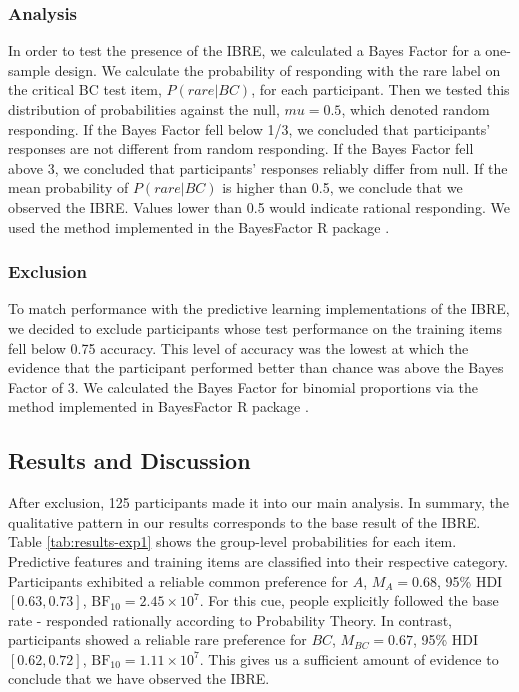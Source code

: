 \documentclass[10pt,letterpaper]{article}
\begin{document}
\subsubsection{Analysis}

In order to test the presence of the IBRE, we calculated a Bayes Factor for a one-sample design.
We calculate the probability of responding with the rare label on the critical BC test item, $P(rare|BC)$, for each participant.
Then we tested this distribution of probabilities against the null, $mu = 0.5$, which denoted random responding.
If the Bayes Factor fell below 1/3, we concluded that participants' responses are not different from random responding.
If the Bayes Factor fell above 3, we concluded that participants' responses reliably differ from null.
If the mean probability of $P(rare|BC)$ is higher than 0.5, we conclude that we observed the IBRE.
Values lower than 0.5 would indicate rational responding.
We used the method implemented in the BayesFactor R package \cite{morey2022bayes}.

\subsubsection{Exclusion}

To match performance with the predictive learning implementations of the IBRE, we decided to exclude participants whose test performance on the training items fell below 0.75 accuracy.
This level of accuracy was the lowest at which the evidence that the participant performed better than chance was above the Bayes Factor of 3.
We calculated the Bayes Factor for binomial proportions via the method implemented in BayesFactor R package \cite{morey2022bayes}.

\subsection{Results and Discussion}

After exclusion, 125 participants made it into our main analysis.
In summary, the qualitative pattern in our results corresponds to the base result of the IBRE.
Table \ref*{tab:results-exp1} shows the group-level probabilities for each item.
Predictive features and training items are classified into their respective category.
Participants exhibited a reliable common preference for $A$, $M_{A} = 0.68$, 95\% HDI $[0.63, 0.73]$, $\mathrm{BF}_{10} = 2.45 \times 10^{7}$.
For this cue, people explicitly followed the base rate - responded rationally according to Probability Theory.
In contrast, participants showed a reliable rare preference for $BC$, $M_{BC} = 0.67$, 95\% HDI $[0.62, 0.72]$, $\mathrm{BF}_{10} = 1.11 \times 10^{7}$.
This gives us a sufficient amount of evidence to conclude that we have observed the IBRE.
\end{document}
